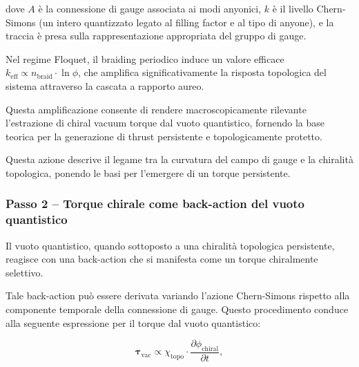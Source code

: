 \documentclass[11pt,a4paper]{article}
\theoremstyle{plain}
\theoremstyle{definition}
\begin{document}
dove \(A\) è la connessione di gauge associata ai modi anyonici, \(k\) è il livello Chern-Simons (un intero quantizzato legato al filling factor e al tipo di anyone), e la traccia è presa sulla rappresentazione appropriata del gruppo di gauge.

Nel regime Floquet, il braiding periodico induce un valore efficace \(k_{\text{eff}} \propto n_{\text{braid}} \cdot \ln\phi\), che amplifica significativamente la risposta topologica del sistema attraverso la cascata a rapporto aureo. 


\vspace{0.3cm}



Questa amplificazione consente di rendere macroscopicamente rilevante l'estrazione di chiral vacuum torque dal vuoto quantistico, fornendo la base teorica per la generazione di thrust persistente e topologicamente protetto.

\vspace{0.3cm}


Questa azione descrive il legame tra la curvatura del campo di gauge e la chiralità topologica, ponendo le basi per l'emergere di un torque persistente.




\vspace{0.4cm}




\subsubsection{Passo 2 – Torque chirale come back-action del vuoto quantistico}

Il vuoto quantistico, quando sottoposto a una chiralità topologica persistente, reagisce con una back-action che si manifesta come un torque chiralmente selettivo. 


\vspace{0.3cm}

\begin{tcolorbox}[
    colback=cyan!5!white,
    colframe=teal!80!black,
    coltitle=white,
    fonttitle=\bfseries,
    title=Derivazione del Chiral Vacuum Torque dalla Back-Action Chern-Simons,
    sharp corners,
    boxrule=0.8pt,
    enhanced,
    attach boxed title to top left={xshift=12pt, yshift=-3mm},
    boxed title style={colback=teal!80!black}
]

Tale back-action può essere derivata variando l'azione Chern-Simons rispetto alla componente temporale della connessione di gauge. Questo procedimento conduce alla seguente espressione per il torque dal vuoto quantistico:

\begin{equation}
\boldsymbol{\tau}_{\text{vac}} \propto \chi_{\text{topo}} \cdot \frac{\partial \phi_{\text{chiral}}}{\partial t},
\label{eq:vac_torque_basic}
\end{equation}



\end{tcolorbox}
\end{document}
